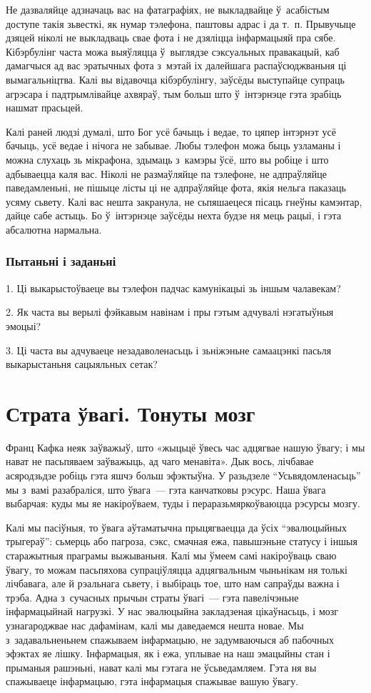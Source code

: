 Не дазваляйце адзначаць вас на фатаграфіях, не выкладвайце ў~асабістым доступе такія зьвесткі, як нумар тэлефона, паштовы адрас і да т.~п. Прывучыце дзяцей ніколі не выкладваць свае фота і не дзяліцца інфармацыяй пра сябе. Кібэрбулінг часта можа выяўляцца ў~выглядзе сэксуальных правакацый, каб дамагчыся ад вас эратычных фота з~мэтай іх далейшага распаўсюджваньня ці вымагальніцтва. Калі вы відавочца кібэрбулінгу, заўсёды выступайце супраць агрэсара і падтрымлівайце ахвяраў, тым больш што ў~інтэрнэце гэта зрабіць нашмат прасьцей.

Калі раней людзі думалі, што Бог усё бачыць і ведае, то цяпер інтэрнэт усё бачыць, усё ведае і нічога не забывае. Любы тэлефон можа быць узламаны і можна слухаць зь мікрафона, здымаць з~камэры ўсё, што вы робіце і што адбываецца каля вас. Ніколі не размаўляйце па тэлефоне, не адпраўляйце паведамленьні, не пішыце лісты ці не адпраўляйце фота, якія нельга паказаць усяму сьвету. Калі вас нешта закранула, не сьпяшаецеся пісаць гнеўны камэнтар, дайце сабе астыць. Бо ў~інтэрнэце заўсёды нехта будзе ня мець рацыі, і гэта абсалютна нармальна.

\subsubsection{Пытаньні і заданьні}

1. Ці выкарыстоўваеце вы тэлефон падчас камунікацыі зь іншым чалавекам?

2. Як часта вы верылі фэйкавым навінам і пры гэтым адчувалі нэгатыўныя эмоцыі?

3. Ці часта вы адчуваеце незадаволенасьць і зьніжэньне самаацэнкі пасьля выкарыстаньня сацыяльных сетак?


\section{Страта ўвагі. Тонуты мозг}

Франц Кафка неяк заўважыў, што «жыцьцё ўвесь час адцягвае нашую ўвагу; і мы нават не пасьпяваем заўважыць, ад чаго менавіта». Дык вось, лічбавае асяродзьдзе робіць гэта яшчэ больш эфэктыўна. У разьдзеле ``Усьвядомленасьць'' мы з~вамі разабраліся, што ўвага~--- гэта канчатковы рэсурс. Наша ўвага выбарчая: куды мы яе накіроўваем, туды і пераразьмяркоўваюцца рэсурсы мозгу.

Калі мы пасіўныя, то ўвага аўтаматычна прыцягваецца да ўсіх ``эвалюцыйных трыгераў'': сьмерць або пагроза, сэкс, смачная ежа, павышэньне статусу і іншыя старажытныя праграмы выжываньня. Калі мы ўмеем самі накіроўваць сваю ўвагу, то можам пасьпяхова супраціўляцца адцягвальным чыньнікам ня толькі лічбавага, але й рэальнага сьвету, і выбіраць тое, што нам сапраўды важна і трэба. Адна з~сучасных прычын страты ўвагі~--- гэта павелічэньне інфармацыйнай нагрузкі. У нас эвалюцыйна закладзеная цікаўнасьць, і мозг узнагароджвае нас дафамінам, калі мы даведаемся нешта новае. Мы з~задавальненьнем спажываем інфармацыю, не задумваючыся аб пабочных эфэктах яе лішку. Інфармацыя, як і ежа, уплывае на наш эмацыйны стан і прыманыя рашэньні, нават калі мы гэтага не ўсьведамляем. Гэта ня вы спажываеце інфармацыю, гэта інфармацыя спажывае вашую ўвагу.

